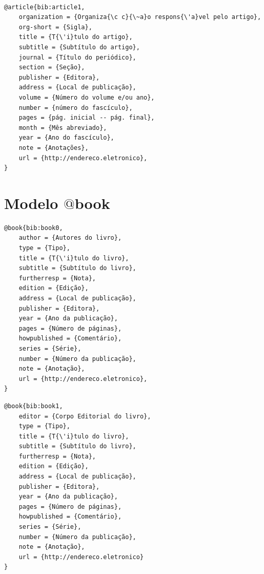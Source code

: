 \documentclass[a4paper,12pt,oneside,onecolumn,final,fleqn]{repUERJ}
\begin{document}
\noindent{}\\

\begin{verbatim}
@article{bib:article1,
    organization = {Organiza{\c c}{\~a}o respons{\'a}vel pelo artigo},
    org-short = {Sigla},
    title = {T{\'i}tulo do artigo},
    subtitle = {Subtítulo do artigo},
    journal = {Título do periódico},
    section = {Seção},
    publisher = {Editora},
    address = {Local de publicação},
    volume = {Número do volume e/ou ano},
    number = {número do fascículo},
    pages = {pág. inicial -- pág. final},
    month = {Mês abreviado},
    year = {Ano do fascículo},
    note = {Anotações},
    url = {http://endereco.eletronico},
}
\end{verbatim}

\section{Modelo $@$book}

\noindent{}

\begin{verbatim}
@book{bib:book0,
    author = {Autores do livro},
    type = {Tipo},
    title = {T{\'i}tulo do livro},
    subtitle = {Subtítulo do livro},
    furtherresp = {Nota},
    edition = {Edição},
    address = {Local de publicação},
    publisher = {Editora},
    year = {Ano da publicação},
    pages = {Número de páginas},
    howpublished = {Comentário},
    series = {Série},
    number = {Número da publicação},
    note = {Anotação},
    url = {http://endereco.eletronico},
}
\end{verbatim}

\noindent{}

\begin{verbatim}
@book{bib:book1,
    editor = {Corpo Editorial do livro},
    type = {Tipo},
    title = {T{\'i}tulo do livro},
    subtitle = {Subtítulo do livro},
    furtherresp = {Nota},
    edition = {Edição},
    address = {Local de publicação},
    publisher = {Editora},
    year = {Ano da publicação},
    pages = {Número de páginas},
    howpublished = {Comentário},
    series = {Série},
    number = {Número da publicação},
    note = {Anotação},
    url = {http://endereco.eletronico}
}
\end{verbatim}
\end{document}
